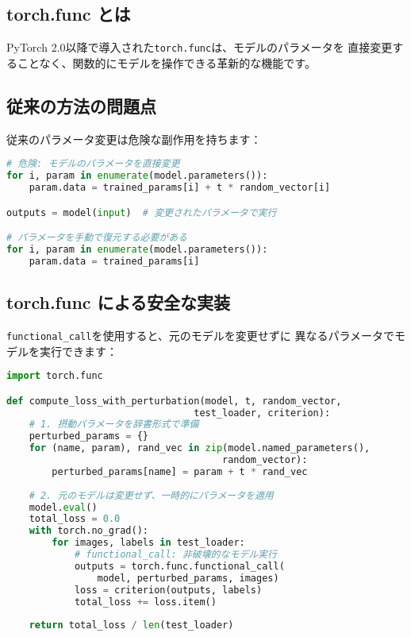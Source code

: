 \documentclass{ltjsarticle}      %
\begin{document}
\subsection{torch.func とは}
PyTorch 2.0以降で導入された\texttt{torch.func}は、モデルのパラメータを
直接変更することなく、関数的にモデルを操作できる革新的な機能です。

\subsection{従来の方法の問題点}
従来のパラメータ変更は危険な副作用を持ちます：

\begin{lstlisting}[language=Python]
# 危険: モデルのパラメータを直接変更
for i, param in enumerate(model.parameters()):
    param.data = trained_params[i] + t * random_vector[i]

outputs = model(input)  # 変更されたパラメータで実行

# パラメータを手動で復元する必要がある
for i, param in enumerate(model.parameters()):
    param.data = trained_params[i]
\end{lstlisting}

\subsection{torch.func による安全な実装}
\texttt{functional\_call}を使用すると、元のモデルを変更せずに
異なるパラメータでモデルを実行できます：

\begin{lstlisting}[language=Python]
import torch.func

def compute_loss_with_perturbation(model, t, random_vector, 
                                 test_loader, criterion):
    # 1. 摂動パラメータを辞書形式で準備
    perturbed_params = {}
    for (name, param), rand_vec in zip(model.named_parameters(), 
                                      random_vector):
        perturbed_params[name] = param + t * rand_vec
    
    # 2. 元のモデルは変更せず、一時的にパラメータを適用
    model.eval()
    total_loss = 0.0
    with torch.no_grad():
        for images, labels in test_loader:
            # functional_call: 非破壊的なモデル実行
            outputs = torch.func.functional_call(
                model, perturbed_params, images)
            loss = criterion(outputs, labels)
            total_loss += loss.item()
    
    return total_loss / len(test_loader)
\end{lstlisting}
\end{document}
